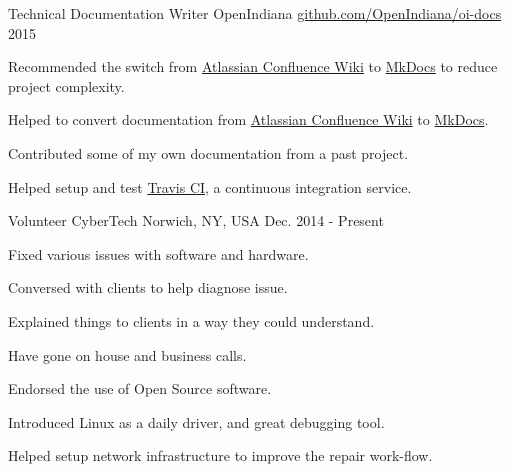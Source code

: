


\begin{cventries}


\cventry
{Technical Documentation Writer} %
{OpenIndiana} %
{\href{https://github.com/OpenIndiana/oi-docs}{github.com/OpenIndiana/oi-docs}} %
{2015} %
{ %
\begin{cvitems}
\item{Recommended the switch from \href{https://www.atlassian.com/software/confluence}{Atlassian Confluence Wiki} to \href{http://www.mkdocs.org/}{MkDocs} to reduce project complexity.}
\item {Helped to convert documentation from \href{https://www.atlassian.com/software/confluence}{Atlassian Confluence Wiki} to \href{http://www.mkdocs.org/}{MkDocs}.}
\item {Contributed some of my own documentation from a past project.}
\item {Helped setup and test \href{https://travis-ci.org/}{Travis CI}, a continuous integration service.}
\end{cvitems}
}


\cventry
{Volunteer} %
{CyberTech} %
{Norwich, NY, USA} %
{Dec. 2014 - Present} %
{ %
\begin{cvitems}
\item {Fixed various issues with software and hardware.}
\item {Conversed with clients to help diagnose issue.}
\item {Explained things to clients in a way they could understand.}
\item {Have gone on house and business calls.}
\item {Endorsed the use of Open Source software.}
\item {Introduced Linux as a daily driver, and great debugging tool.}
\item {Helped setup network infrastructure to improve the repair work-flow.}
\end{cvitems}
}


\end{cventries}
